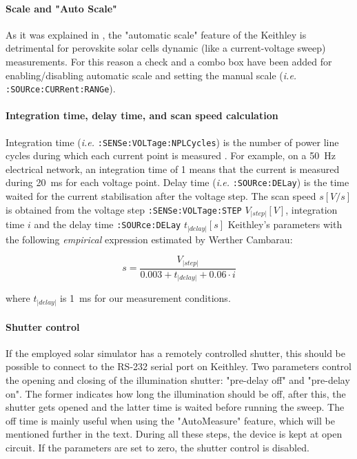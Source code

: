 		\paragraph{Scale and "Auto Scale"}
		As it was explained in , the "automatic scale" feature of the Keithley is detrimental for perovskite solar cells dynamic (like a current\hyp{}voltage sweep) measurements.
		For this reason a check and a combo box have been added for enabling\-/disabling automatic scale and setting the manual scale (\textsl{i.e.} \texttt{:SOURce:CURRent:RANGe}).
		
		\paragraph{Integration time, delay time, and scan speed calculation}
		Integration time (\textsl{i.e.} \texttt{:SENSe:VOLTage:NPLCycles}) is the number of power line cycles during which each current point is measured \cite{KeithleyInstruments2011}.
		For example, on a \SI{50}{\Hz} electrical network, an integration time of 1 means that the current is measured during \SI{20}{\ms} for each voltage point.
		Delay time (\textsl{i.e.} \texttt{:SOURce:DELay}) is the time waited for the current stabilisation after the voltage step.
The scan speed $s[V/s]$ is obtained from the voltage step \texttt{:SENSe:VOLTage:STEP} $V_|step|[V]$, integration time $i$ and the delay time \texttt{:SOURce:DELay} $t_|delay|[s]$ Keithley's parameters with the following \textit{empirical} expression estimated by Werther Cambarau:

\begin{equation}
s = \frac{V_|step|}{0.003 + t_|delay| + 0.06 \cdot i}
\end{equation}

where $t_|delay|$ is \SI{1}{\ms} for our measurement conditions.

\paragraph{Shutter control}
If the employed solar simulator has a remotely controlled shutter, this should be possible to connect to the RS-232 serial port on Keithley.
Two parameters control the opening and closing of the illumination shutter: "pre-delay off" and "pre-delay on".
The former indicates how long the illumination should be off, after this, the shutter gets opened and the latter time is waited before running the sweep.
The off time is mainly useful when using the "AutoMeasure" feature, which will be mentioned further in the text.
During all these steps, the device is kept at open circuit.
If the parameters are set to zero, the shutter control is disabled.

